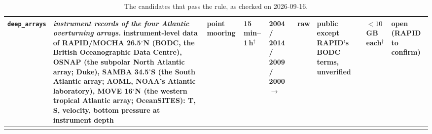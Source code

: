 \documentclass[10pt]{article}
\newcommand{\code}[1]{\texttt{#1}}
\begin{document}
{\begin{longtable}{@{}L{1.7cm}L{2.85cm}L{1.15cm}L{1.25cm}L{1.7cm}L{1.15cm}L{1.95cm}L{1.5cm}L{1.45cm}@{}}
\addlinespace
\code{deep\_\allowbreak arrays} & \emph{instrument records of the four Atlantic overturning arrays.} instrument-level data of RAPID/MOCHA 26.5$^\circ$N (BODC, the British Oceanographic Data Centre), OSNAP (the subpolar North Atlantic array; Duke), SAMBA 34.5$^\circ$S (the South Atlantic array; AOML, NOAA's Atlantic laboratory), MOVE 16$^\circ$N (the western tropical Atlantic array; OceanSITES): T, S, velocity, bottom pressure at instrument depth & point mooring & 15\,min--1\,h$^\dagger$ & 2004 / 2014 / 2009 / 2000 $\to$ & raw & public except RAPID's BODC terms, unverified & $< 10$\,GB each$^\dagger$ & open (RAPID to confirm) \\
\bottomrule
\caption{The candidates that pass the rule, as checked on 2026-09-16.}
\label{tab:ledger}
\end{longtable}}
\end{document}
